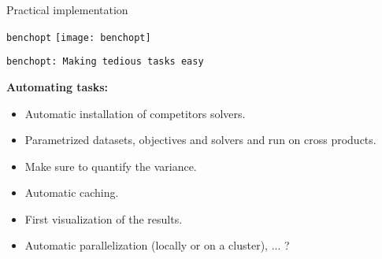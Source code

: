 \documentclass[unknownkeysallowed]{beamer}
\begin{document}
\begin{frame}{Practical implementation}
\begin{minipage}[t]{0.57\textwidth}
{%
        }
        \end{minipage}


\end{frame}

\begin{frame}{\texttt{benchopt}}
    \centering
    \texttt{[image: benchopt]}\\
\end{frame}



\begin{frame}{\texttt{benchopt: Making tedious tasks easy}}

    {\bf Automating tasks:}\\[1.2em]
    \begin{itemize}\itemsep.7em
        \item Automatic installation of competitors solvers.
        \item Parametrized datasets, objectives and solvers and run on cross products.
        \item Make sure to quantify the variance.
        \item Automatic caching.
        \item First visualization of the results.
        \item Automatic parallelization (locally or on a cluster), ... ?
    \end{itemize}
\end{frame}
\end{document}
